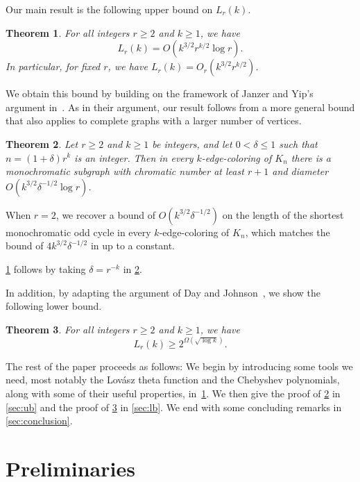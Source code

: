 \documentclass[10pt,a4paper]{amsart}
\newtheorem{theorem}{Theorem}
\numberwithin{theorem}{section}
\renewcommand{\le}{\leqslant}
\renewcommand{\ge}{\geqslant}
\newcommand{\lpr}[1]{\left(#1\right)}
\begin{document}
Our main result is the following upper bound on $L_r(k)$.

\begin{theorem}\label{thm:ub}
 For all integers $r\ge 2$ and $k\ge 1$, we have
 \[L_r(k)= O\lpr{k^{3/2}r^{k/2}\log r}.\]
 In particular, for fixed $r$, we have $L_r(k)= O_r\lpr{k^{3/2}r^{k/2}}$.
\end{theorem}

We obtain this bound by building on the framework of Janzer and Yip's argument in~\cite{JanzerYip2026ShortMonochromaticOddCycles}. As in their argument, our result follows from a more general bound that also applies to complete graphs with a larger number of vertices.

\begin{theorem}\label{thm:ub-gen}
 Let $r\ge 2$ and $k\ge 1$ be integers, and let $0<\delta \le 1$ such that $n=(1+\delta)r^k$ is an integer. Then in every $k$-edge-coloring of $K_n$ there is a monochromatic subgraph with chromatic number at least $r+1$ and diameter $O(k^{3/2}\delta^{-1/2}\log r)$.
\end{theorem}
When $r=2$, we recover a bound of $O(k^{3/2}\delta^{-1/2})$ on the length of the shortest monochromatic odd cycle in every $k$-edge-coloring of $K_n$, which matches the bound of $4k^{3/2}\delta^{-1/2}$ in \cite[Theorem~1.5]{JanzerYip2026ShortMonochromaticOddCycles} up to a constant.

\cref{thm:ub} follows by taking $\delta=r^{-k}$ in \cref{thm:ub-gen}.

In addition, by adapting the argument of Day and Johnson~\cite{DayJohnson2017MulticolourRamseyOddCycles}, we show the following lower bound.


\begin{theorem}\label{thm:lb}
    For all integers $r\ge 2$ and $k\ge 1$, we have
    \[L_r(k)\ge 2^{\Omega(\sqrt{\log k})}.\]
\end{theorem}


The rest of the paper proceeds as follows: We begin by introducing some tools we need, most notably the Lov\'asz theta function and the Chebyshev polynomials, along with some of their useful properties, in~\cref{sec:prelims}. We then give the proof of \cref{thm:ub-gen} in \cref{sec:ub} and the proof of \cref{thm:lb} in \cref{sec:lb}. We end with some concluding remarks in \cref{sec:conclusion}.

\section{Preliminaries}
\label{sec:prelims}
\end{document}
